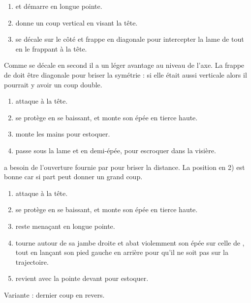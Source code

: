 \begin{technique}

\begin{enumerate}
	\item \A et \D démarre en longue pointe.
	
	\item \A donne un coup vertical en visant la tête.
	
	\item \D se décale sur le côté et frappe en diagonale pour intercepter la lame de \A tout en le frappant à la tête.
\end{enumerate}

Comme \D se décale en second il a un léger avantage au niveau de l'axe.
La frappe de \D doit être diagonale pour briser la symétrie : si elle était aussi verticale alors il pourrait y avoir un coup double.

\end{technique}


\begin{technique}

\begin{enumerate}
	\item \A attaque \D à la tête.
	
	\item \D se protège en se baissant, et monte son épée en tierce haute.
	
	\item \A monte les mains pour estoquer.
	
	\item \D passe sous la lame et en demi-épée, pour escroquer dans la visière.
\end{enumerate}

\D a besoin de l'ouverture fournie par \A pour briser la distance.
La position en 2) est bonne car si \A part \D peut donner un grand coup.

\end{technique}


\begin{technique}

\begin{enumerate}
	\item \A attaque \D à la tête.
	
	\item \D se protège en se baissant, et monte son épée en tierce haute.
	
	\item \A reste menaçant en longue pointe.
	
	\item \D tourne autour de sa jambe droite et abat violemment son épée sur celle de \A, tout en lançant son pied gauche en arrière pour qu'il ne soit pas sur la trajectoire.
	
	\item \D revient avec la pointe devant pour estoquer.
\end{enumerate}

Variante : dernier coup en revers.
\end{technique}


